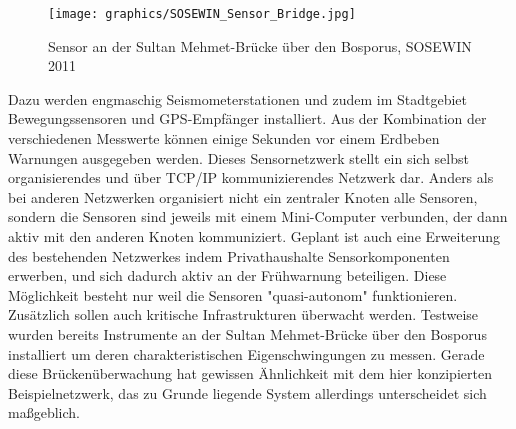 \begin{wrapfigure}{r}{0.5\textwidth}
  \begin{center}
 	 \texttt{[image: graphics/SOSEWIN\_Sensor\_Bridge.jpg]} 
	\caption{Sensor an der Sultan Mehmet-Brücke über den Bosporus, SOSEWIN 2011}
  \end{center}
\end{wrapfigure}
Dazu werden engmaschig Seismometerstationen und zudem im Stadtgebiet Bewegungssensoren  und GPS-Empfänger installiert. Aus der Kombination der verschiedenen Messwerte können einige Sekunden vor einem Erdbeben Warnungen ausgegeben werden. Dieses Sensornetzwerk stellt ein sich selbst organisierendes und über TCP/IP kommunizierendes Netzwerk dar. Anders als bei anderen Netzwerken organisiert nicht ein zentraler Knoten alle Sensoren, sondern die Sensoren sind jeweils mit einem Mini-Computer verbunden, der dann aktiv mit den anderen Knoten kommuniziert. Geplant ist auch eine Erweiterung des bestehenden Netzwerkes indem Privathaushalte Sensorkomponenten erwerben, und sich dadurch aktiv an der Frühwarnung beteiligen. Diese Möglichkeit besteht nur weil die Sensoren "quasi-autonom" funktionieren. Zusätzlich sollen auch kritische Infrastrukturen überwacht werden. Testweise wurden bereits Instrumente an der Sultan Mehmet-Brücke über den Bosporus installiert um deren charakteristischen Eigenschwingungen zu messen. Gerade diese Brückenüberwachung hat gewissen Ähnlichkeit mit dem hier konzipierten Beispielnetzwerk, das zu Grunde liegende System allerdings unterscheidet sich maßgeblich. \citep{luhr_sekunden_2011}